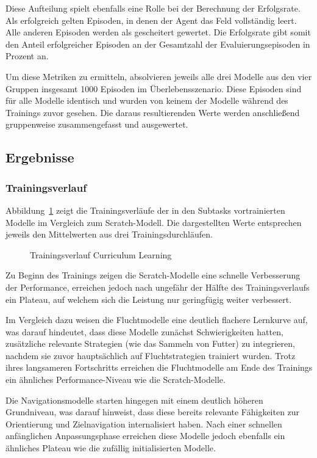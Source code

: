 Diese Aufteilung spielt ebenfalls eine Rolle bei der Berechnung der Erfolgsrate. Als erfolgreich gelten Episoden, in denen der Agent das Feld vollständig leert. Alle anderen Episoden werden als gescheitert gewertet. Die Erfolgsrate gibt somit den Anteil erfolgreicher Episoden an der Gesamtzahl der Evaluierungsepisoden in Prozent an.

Um diese Metriken zu ermitteln, absolvieren jeweils alle drei Modelle aus den vier Gruppen insgesamt 1000 Episoden im Überlebensszenario. Diese Episoden sind für alle Modelle identisch und wurden von keinem der Modelle während des Trainings zuvor gesehen. Die daraus resultierenden Werte werden anschließend gruppenweise zusammengefasst und ausgewertet.

\subsection{Ergebnisse}
\subsubsection{Trainingsverlauf}
Abbildung~\ref{fig:normalized_rewards} zeigt die Trainingsverläufe der in den Subtasks vortrainierten Modelle im Vergleich zum Scratch-Modell. Die dargestellten Werte entsprechen jeweils den Mittelwerten aus drei Trainingsdurchläufen.
\begin{figure}[htbp]
  \centering
  \caption{Trainingsverlauf Curriculum Learning}
  \label{fig:normalized_rewards}
\end{figure}
Zu Beginn des Trainings zeigen die Scratch-Modelle eine schnelle Verbesserung der Performance, erreichen jedoch nach ungefähr der Hälfte des Trainingsverlaufs ein Plateau, auf welchem sich die Leistung nur geringfügig weiter verbessert.

Im Vergleich dazu weisen die Fluchtmodelle eine deutlich flachere Lernkurve auf, was darauf hindeutet, dass diese Modelle zunächst Schwierigkeiten hatten, zusätzliche relevante Strategien (wie das Sammeln von Futter) zu integrieren, nachdem sie zuvor hauptsächlich auf Fluchtstrategien trainiert wurden. Trotz ihres langsameren Fortschritts erreichen die Fluchtmodelle am Ende des Trainings ein ähnliches Performance-Niveau wie die Scratch-Modelle.

Die Navigationsmodelle starten hingegen mit einem deutlich höheren Grundniveau, was darauf hinweist, dass diese bereits relevante Fähigkeiten zur Orientierung und Zielnavigation internalisiert haben. Nach einer schnellen anfänglichen Anpassungsphase erreichen diese Modelle jedoch ebenfalls ein ähnliches Plateau wie die zufällig initialisierten Modelle.

